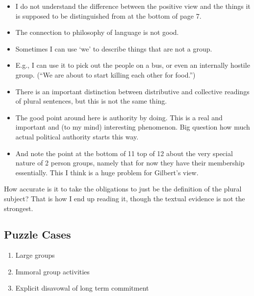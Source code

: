 \documentclass[11pt,]{article}
\providecommand{\tightlist}{%
  \setlength{\itemsep}{0pt}\setlength{\parskip}{0pt}}
\begin{document}
\begin{itemize}
\tightlist
\item
  I do not understand the difference between the positive view and the
  things it is supposed to be distinguished from at the bottom of page
  7.
\item
  The connection to philosophy of language is not good.
\item
  Sometimes I can use `we' to describe things that are not a group.
\item
  E.g., I can use it to pick out the people on a bus, or even an
  internally hostile group. (``We are about to start killing each other
  for food.'')
\item
  There is an important distinction between distributive and collective
  readings of plural sentences, but this is not the same thing.
\item
  The good point around here is authority by doing. This is a real and
  important and (to my mind) interesting phenomenon. Big question how
  much actual political authority starts this way.
\item
  And note the point at the bottom of 11 top of 12 about the very
  special nature of 2 person groups, namely that for now they have their
  membership essentially. This I think is a huge problem for Gilbert's
  view.
\end{itemize}

How accurate is it to take the obligations to just be the definition of
the plural subject? That is how I end up reading it, though the textual
evidence is not the strongest.

\hypertarget{puzzle-cases}{%
\subsection{Puzzle Cases}\label{puzzle-cases}}

\begin{enumerate}
\def\labelenumi{\arabic{enumi}.}
\tightlist
\item
  Large groups
\item
  Immoral group activities
\item
  Explicit disavowal of long term commitment
\end{enumerate}
\end{document}
